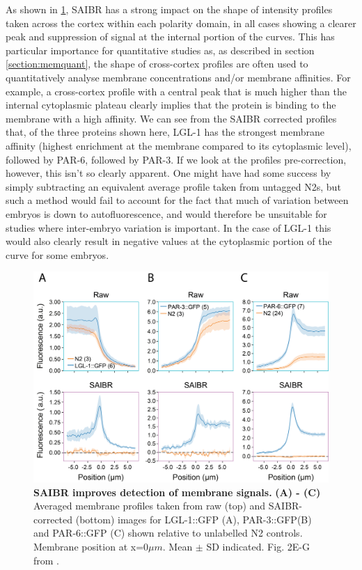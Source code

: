 \documentclass[12pt]{"report"}
\newcommand{\mycaption}[2]{\caption[#1]{\textbf{#1.} #2}}
\begin{document}
As shown in \cref{fig:saibr_membrane_profiles}, SAIBR has a strong impact on the shape of intensity profiles taken across the cortex within each polarity domain, in all cases showing a clearer peak and suppression of signal at the internal portion of the curves. This has particular importance for quantitative studies as, as described in section \ref{section:memquant}, the shape of cross-cortex profiles are often used to quantitatively analyse membrane concentrations and/or membrane affinities. For example, a cross-cortex profile with a central peak that is much higher than the internal cytoplasmic plateau clearly implies that the protein is binding to the membrane with a high affinity. We can see from the SAIBR corrected profiles that, of the three proteins shown here, LGL-1 has the strongest membrane affinity (highest enrichment at the membrane compared to its cytoplasmic level), followed by PAR-6, followed by PAR-3. If we look at the profiles pre-correction, however, this isn't so clearly apparent. One might have had some success by simply subtracting an equivalent average profile taken from untagged N2s, but such a method would fail to account for the fact that much of variation between embryos is down to autofluorescence, and would therefore be unsuitable for studies where inter-embryo variation is important. In the case of LGL-1 this would also clearly result in negative values at the cytoplasmic portion of the curve for some embryos.\\

\begin{figure}
\includegraphics[scale=1]{saibr_membrane_profiles}
\centering
\mycaption{SAIBR improves detection of membrane signals}{
\textbf{(A) - (C)} Averaged membrane profiles taken from raw (top) and SAIBR-corrected (bottom) images for LGL-1::GFP (A), PAR-3::GFP(B) and PAR-6::GFP (C) shown relative to unlabelled N2 controls. Membrane position at x=0$\mu m$. Mean $\pm$ SD indicated.
Fig. 2E-G from \textcite{Rodrigues2022}.}
\label{fig:saibr_membrane_profiles}
\end{figure}
\end{document}
